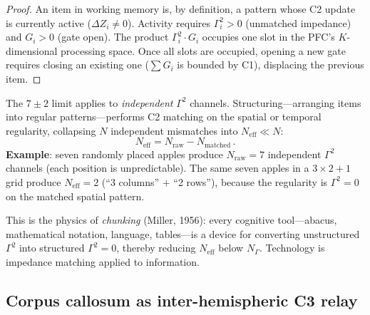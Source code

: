 \documentclass[aps,pre,twocolumn,superscriptaddress,floatfix]{revtex4-2}
\begin{document}
\begin{proof}
An item in working memory is, by definition, a
pattern whose C2 update is currently active
($\Delta Z_i \neq 0$).
Activity requires $\Gamma_i^2 > 0$
(unmatched impedance) and $G_i > 0$ (gate open).
The product $\Gamma_i^2 \cdot G_i$ occupies one
slot in the PFC's $K$-dimensional processing
space.
Once all slots are occupied, opening a new gate
requires closing an existing one
($\sum G_i$ is bounded by C1), displacing the
previous item.
\end{proof}

\begin{remark}
\label{rem:chunking}
The $7 \pm 2$ limit applies to
\emph{independent} $\Gamma^2$ channels.
Structuring---arranging items into regular
patterns---performs C2 matching on the spatial
or temporal regularity, collapsing $N$ independent
mismatches into $N_{\text{eff}} \ll N$:
\begin{equation}
  N_{\text{eff}} = N_{\text{raw}}
    - N_{\text{matched}}\,.
  \label{eq:chunking}
\end{equation}
\textbf{Example}: seven randomly placed apples
produce $N_{\text{raw}} = 7$ independent
$\Gamma^2$ channels (each position is
unpredictable).
The same seven apples in a $3 \times 2 + 1$ grid
produce $N_{\text{eff}} = 2$
(``3 columns'' $+$ ``2 rows''), because the
regularity is $\Gamma^2 = 0$ on the matched
spatial pattern.

This is the physics of \emph{chunking}
(Miller, 1956): every cognitive tool---abacus,
mathematical notation, language, tables---is a
device for converting unstructured $\Gamma^2$
into structured $\Gamma^2 = 0$, thereby reducing
$N_{\text{eff}}$ below $N_\Gamma$.
Technology is impedance matching applied to
information.
\end{remark}

\subsection{Corpus callosum as inter-hemispheric C3 relay}
\label{sec:corpus-callosum}
\end{document}

